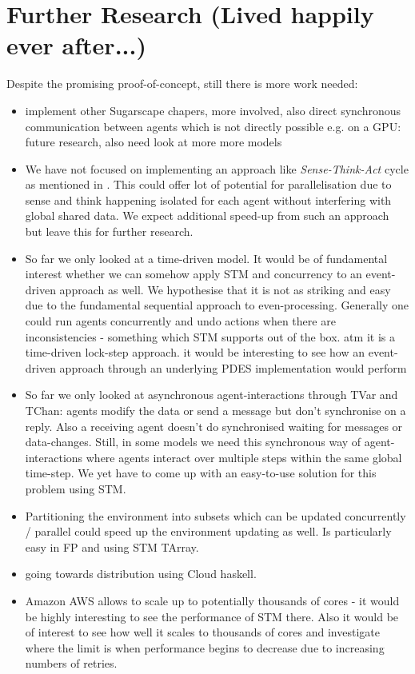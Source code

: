 \section{Further Research (Lived happily ever after...)}
Despite the promising proof-of-concept, still there is more work needed:

\begin{itemize}
	\item implement other Sugarscape chapers, more involved, also direct synchronous communication between agents which is not directly possible e.g. on a GPU: future research, also need look at more more models
	
	\item We have not focused on implementing an approach like \textit{Sense-Think-Act} cycle as mentioned in \cite{xiao_survey_2018}. This could offer lot of potential for parallelisation due to sense and think happening isolated for each agent without interfering with global shared data. We expect additional speed-up from such an approach but leave this for further research.
	
	\item So far we only looked at a time-driven model. It would be of fundamental interest whether we can somehow apply STM and concurrency to an event-driven approach as well. We hypothesise that it is not as striking and easy due to the fundamental sequential approach to even-processing. Generally one could run agents concurrently and undo actions when there are inconsistencies - something which STM supports out of the box. atm it is a time-driven lock-step approach. it would be interesting to see how an event-driven approach through an underlying PDES implementation would perform
	
	\item So far we only looked at asynchronous agent-interactions through TVar and TChan: agents modify the data or send a message but don't synchronise on a reply. Also a receiving agent doesn't do synchronised waiting for messages or data-changes. Still, in some models we need this synchronous way of agent-interactions where agents interact over multiple steps within the same global time-step. We yet have to come up with an easy-to-use solution for this problem using STM.
	
	\item Partitioning the environment into subsets which can be updated concurrently / parallel could speed up the environment updating as well. Is particularly easy in FP and using STM TArray.
	
	\item going towards distribution using Cloud haskell.
	
	\item Amazon AWS allows to scale up to potentially thousands of cores - it would be highly interesting to see the performance of STM there. Also it would be of interest to see how well it scales to thousands of cores and investigate where the limit is when performance begins to decrease due to increasing numbers of retries.
\end{itemize}
